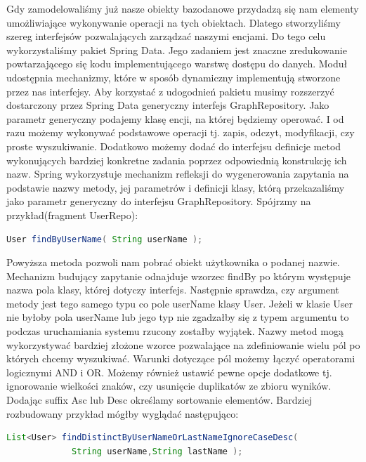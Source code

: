 Gdy zamodelowaliśmy już nasze obiekty bazodanowe przydadzą się nam elementy umożliwiające wykonywanie operacji na tych obiektach. Dlatego stworzyliśmy szereg interfejsów pozwalających zarządzać naszymi encjami. Do tego celu wykorzystaliśmy pakiet Spring Data. Jego zadaniem jest znaczne zredukowanie powtarzającego się kodu implementującego warstwę dostępu do danych. Moduł udostępnia mechanizmy, które w sposób dynamiczny implementują stworzone przez nas interfejsy. Aby korzystać z udogodnień pakietu musimy rozszerzyć dostarczony przez Spring Data generyczny interfejs GraphRepository. Jako parametr generyczny podajemy klasę encji, na której będziemy operować. I od razu możemy wykonywać podstawowe operacji tj. zapis, odczyt, modyfikacji, czy proste wyszukiwanie. Dodatkowo możemy dodać do interfejsu definicje metod wykonujących bardziej konkretne zadania poprzez odpowiednią konstrukcję ich nazw. Spring wykorzystuje mechanizm refleksji do wygenerowania zapytania na podstawie nazwy metody, jej parametrów i definicji klasy, którą przekazaliśmy jako parametr generyczny do interfejsu GraphRepository. Spójrzmy na przykład(fragment UserRepo):

\begin{lstlisting}[language=Java]
User findByUserName( String userName );
\end{lstlisting}

Powyższa metoda pozwoli nam pobrać obiekt użytkownika o podanej nazwie. Mechanizm budujący zapytanie odnajduje wzorzec findBy po którym występuje nazwa pola klasy, której dotyczy interfejs. Następnie sprawdza, czy argument metody jest tego samego typu co pole userName klasy User. Jeżeli w klasie User nie byłoby pola userName lub jego typ nie zgadzałby się z typem argumentu to podczas uruchamiania systemu rzucony zostałby wyjątek. 
Nazwy metod mogą wykorzystywać bardziej złożone wzorce pozwalające na zdefiniowanie wielu pól po których chcemy wyszukiwać. Warunki dotyczące pól możemy łączyć operatorami logicznymi AND i OR.  Możemy również ustawić pewne opcje dodatkowe tj. ignorowanie wielkości znaków, czy usunięcie duplikatów ze zbioru wyników. Dodając suffix Asc lub Desc określamy sortowanie elementów. Bardziej rozbudowany przykład mógłby wyglądać następująco:

\begin{lstlisting}[language=Java]
List<User> findDistinctByUserNameOrLastNameIgnoreCaseDesc(
			 String userName,String lastName );
\end{lstlisting}

